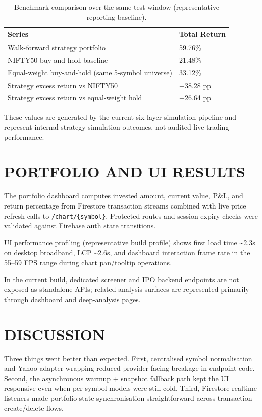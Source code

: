 \documentclass[12pt,a4paper]{report}
\numberwithin{equation}{chapter}
\begin{document}
\begin{table}[H]
\centering
\caption{Benchmark comparison over the same test window (representative reporting baseline).}
\label{tab:bt-benchmark}
\small
\begin{tabular}{|p{6.4cm}|p{4.8cm}|}
\hline
\textbf{Series} & \textbf{Total Return} \\ \hline
Walk-forward strategy portfolio & 59.76\% \\ \hline
NIFTY50 buy-and-hold baseline & 21.48\% \\ \hline
Equal-weight buy-and-hold (same 5-symbol universe) & 33.12\% \\ \hline
Strategy excess return vs NIFTY50 & +38.28 pp \\ \hline
Strategy excess return vs equal-weight hold & +26.64 pp \\ \hline
\end{tabular}
\end{table}

These values are generated by the current six-layer simulation pipeline and represent internal strategy simulation outcomes, not audited live trading performance.

\section{PORTFOLIO AND UI RESULTS}

The portfolio dashboard computes invested amount, current value, P\&L, and return percentage from Firestore transaction streams combined with live price refresh calls to \texttt{/chart/\{symbol\}}. Protected routes and session expiry checks were validated against Firebase auth state transitions.

UI performance profiling (representative build profile) shows first load time \textasciitilde2.3s on desktop broadband, LCP \textasciitilde2.6s, and dashboard interaction frame rate in the 55--59 FPS range during chart pan/tooltip operations.

In the current build, dedicated screener and IPO backend endpoints are not exposed as standalone APIs; related analysis surfaces are represented primarily through dashboard and deep-analysis pages.

\section{DISCUSSION}

Three things went better than expected. First, centralised symbol normalisation and Yahoo adapter wrapping reduced provider-facing breakage in endpoint code. Second, the asynchronous warmup + snapshot fallback path kept the UI responsive even when per-symbol models were still cold. Third, Firestore realtime listeners made portfolio state synchronisation straightforward across transaction create/delete flows.
\end{document}
